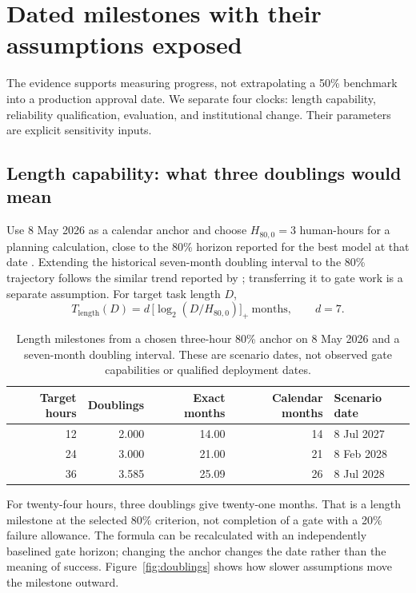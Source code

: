 \section{Dated milestones with their assumptions exposed}
\label{sec:milestones}

The evidence supports measuring progress, not extrapolating a 50\% benchmark into a production
approval date. We separate four clocks: length capability, reliability qualification, evaluation, and
institutional change. Their parameters are explicit sensitivity inputs.

\subsection{Length capability: what three doublings would mean}

Use 8 May 2026 as a calendar anchor and choose $H_{80,0}=3$ human-hours for a planning calculation,
close to the 80\% horizon reported for the best model at that date \citep{metr2026a}. Extending the
historical seven-month doubling interval to the 80\% trajectory follows the similar trend reported by
\citet{kwa2025}; transferring it to gate work is a separate assumption. For target task length $D$,
\begin{equation}
T_{\mathrm{length}}(D)=d\,\bigl[\log_2(D/H_{80,0})\bigr]_{+}\ \text{months},\qquad d=7. \label{eq:length}
\end{equation}

\begin{table}[!htb]
\centering\small
\caption{Length milestones from a chosen three-hour 80\% anchor on 8 May 2026 and a seven-month
doubling interval. These are scenario dates, not observed gate capabilities or qualified deployment
dates.}
\label{tab:length}
\begin{tabular}{@{}r r r r l@{}}
\toprule
Target hours & Doublings & Exact months & Calendar months & Scenario date\\
\midrule
12 & 2.000 & 14.00 & 14 & 8 Jul 2027\\
24 & 3.000 & 21.00 & 21 & 8 Feb 2028\\
36 & 3.585 & 25.09 & 26 & 8 Jul 2028\\
\bottomrule
\end{tabular}
\end{table}

For twenty-four hours, three doublings give twenty-one months. That is a length milestone at the
selected 80\% criterion, not completion of a gate with a 20\% failure allowance. The formula
can be recalculated with an independently baselined gate horizon; changing the anchor changes the date
rather than the meaning of success. Figure~\ref{fig:doublings} shows how slower assumptions move the
milestone outward.

